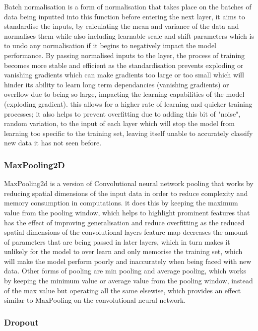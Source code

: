\documentclass[]{final_report}
\begin{document}
Batch normalisation is a form of normalisation that takes place on the batches of data being inputted into this function before entering the next layer, it aims to standardise the inputs, by calculating the mean and variance of the data and normalises them while also including learnable scale and shift parameters which is to undo any normalisation if it begins to negatively impact the model performance. By passing normalised inputs to the layer, the process of training becomes more stable and efficient as the standardisation prevents exploding or vanishing gradients which can make gradients too large or too small which will hinder its ability to learn long term dependancies (vanishing gradients) or overflow due to being so large, impacting the learning capabilities of the model (exploding gradient). this allows for a higher rate of learning and quicker training processes; it also helps to prevent overfitting due to adding this bit of "noise", random variation, to the input of each layer which will stop the model from learning too specific to the training set, leaving itself unable to accurately classify new data it has not seen before.

\subsubsection{MaxPooling2D}

MaxPooling2d is a version of Convolutional neural network pooling that works by reducing spatial dimensions of the input data in order to reduce complexity and memory consumption in computations. it does this by keeping the maximum value from the pooling window, which helps to highlight prominent features that has the effect of improving generalisation and reduce overfitting as the reduced spatial dimensions of the convolutional layers feature map decreases the amount of parameters that are being passed in later layers, which in turn makes it unlikely for the model to over learn and only memorise the training set, which will make the model perform poorly and inaccurately when being faced with new data. Other forms of pooling are min pooling and average pooling, which works by keeping the minimum value or average value from the pooling window, instead of the max value but operating all the same elsewise, which provides an effect similar to MaxPooling on the convolutional neural network. 

\subsubsection{Dropout}
\end{document}
